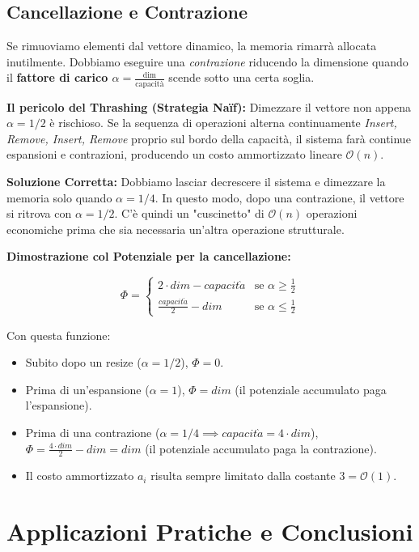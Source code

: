 \documentclass[12pt, a4paper]{article}
\begin{document}
\subsection{Cancellazione e Contrazione}
Se rimuoviamo elementi dal vettore dinamico, la memoria rimarrà allocata inutilmente. Dobbiamo eseguire una \textit{contrazione} riducendo la dimensione quando il \textbf{fattore di carico $\alpha = \frac{\text{dim}}{\text{capacità}}$} scende sotto una certa soglia.

\textbf{Il pericolo del Thrashing (Strategia Naïf):}
Dimezzare il vettore non appena $\alpha = 1/2$ è rischioso. Se la sequenza di operazioni alterna continuamente \textit{Insert, Remove, Insert, Remove} proprio sul bordo della capacità, il sistema farà continue espansioni e contrazioni, producendo un costo ammortizzato lineare $\mathcal{O}(n)$.

\textbf{Soluzione Corretta:}
Dobbiamo lasciar decrescere il sistema e dimezzare la memoria solo quando \textbf{$\alpha = 1/4$}.
In questo modo, dopo una contrazione, il vettore si ritrova con $\alpha = 1/2$. C'è quindi un "cuscinetto" di $\mathcal{O}(n)$ operazioni economiche prima che sia necessaria un'altra operazione strutturale.

\textbf{Dimostrazione col Potenziale per la cancellazione:}

$$\Phi = \begin{cases} 2 \cdot dim - capacit\grave{a} & \text{se } \alpha \ge \frac{1}{2} \\ \frac{capacit\grave{a}}{2} - dim & \text{se } \alpha \le \frac{1}{2} \end{cases}$$


Con questa funzione:
\begin{itemize}
\item Subito dopo un resize ($\alpha = 1/2$), $\Phi = 0$.
\item Prima di un'espansione ($\alpha = 1$), $\Phi = dim$ (il potenziale accumulato paga l'espansione).
\item Prima di una contrazione ($\alpha = 1/4 \implies capacit\grave{a} = 4 \cdot dim$), $\Phi = \frac{4 \cdot dim}{2} - dim = dim$ (il potenziale accumulato paga la contrazione).
\item Il costo ammortizzato $a_i$ risulta sempre limitato dalla costante $3 = \mathcal{O}(1)$.
\end{itemize}

\newpage

\section{Applicazioni Pratiche e Conclusioni}
\end{document}

